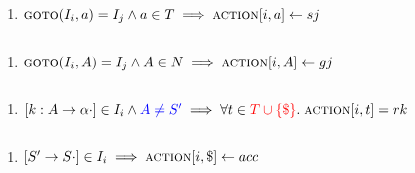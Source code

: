 \begin{frame}{}
  \begin{center}
    \begin{enumerate}[(1)]
      \centering
      \item $\textsc{goto}(I_{i}, a) = I_{j} \land a \in T \implies \textsc{action}[i, a] \gets sj$
    \end{enumerate}

    \begin{columns}
        
    \end{columns}

    \vspace{0.20cm}
    \begin{enumerate}[(2)]
      \centering
      \item $\textsc{goto}(I_{i}, A) = I_{j} \land A \in N \implies \textsc{action}[i, A] \gets gj$
    \end{enumerate}
  \end{center}
\end{frame}

\begin{frame}{}
  \begin{center}
    \begin{columns}
        
    \end{columns}

    \vspace{0.20cm}
    \begin{enumerate}[(3)]
      \centering
      \item $[k: A \to \alpha \cdot] \in I_{i} \land \textcolor{blue}{A \neq S'} \implies
        \forall t \in \textcolor{red}{T \cup \{\$\}}.\; \textsc{action}[i, t] = rk$
    \end{enumerate}
  \end{center}
\end{frame}

\begin{frame}{}
  \begin{center}
    \begin{columns}
        
    \end{columns}

    \vspace{0.20cm}
    \begin{enumerate}[(4)]
      \centering
      \item $[S' \to S \cdot] \in I_{i} \implies \textsc{action}[i, \$] \gets acc$
    \end{enumerate}
  \end{center}
\end{frame}

